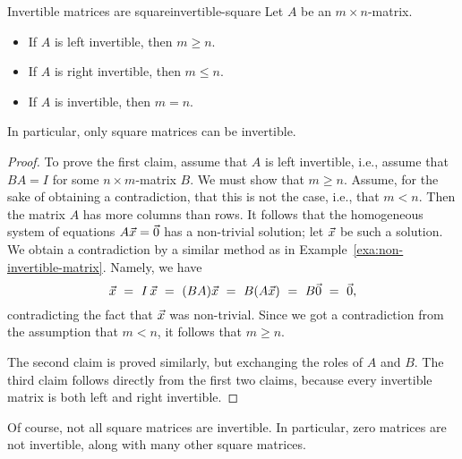 \documentclass{ximera}
\begin{document}
\begin{theorem}{Invertible matrices are square}{invertible-square}
  Let $A$ be an $m\times n$-matrix.
  \begin{itemize}
  \item If $A$ is left invertible, then $m\geq n$.
  \item If $A$ is right invertible, then $m\leq n$.
  \item If $A$ is invertible, then $m=n$.
  \end{itemize}
  In particular, only square matrices can be invertible.
\end{theorem}

\begin{proof}
  To prove the first claim, assume that $A$ is left invertible, i.e.,
  assume that $BA=I$ for some $n\times m$-matrix $B$. We must show
  that $m\geq n$. Assume, for the sake of obtaining a contradiction,
  that this is not the case, i.e., that $m<n$. Then the matrix $A$ has
  more columns than rows. It follows that the homogeneous system of
  equations $A\vec{x}=\vec{0}$ has a non-trivial solution; let
  $\vec{x}$ be such a solution. We obtain a contradiction by a
  similar method as in
  Example~\ref{exa:non-invertible-matrix}. Namely, we have
  \begin{equation*}
    \vec{x} ~=~ I\,\vec{x} ~=~ (BA)\vec{x} ~=~ B(A\vec{x}) ~=~ B\vec{0} ~=~
    \vec{0},
  \end{equation*}
  contradicting the fact that $\vec{x}$ was non-trivial.  Since we
  got a contradiction from the assumption that $m<n$, it follows that
  $m\geq n$.

  The second claim is proved similarly, but exchanging the roles of
  $A$ and $B$.  The third claim follows directly from the first two
  claims, because every invertible matrix is both left and right
  invertible.
\end{proof}

Of course, not all square matrices are invertible. In particular, zero
matrices are not invertible, along with many other square matrices.
\end{document}
